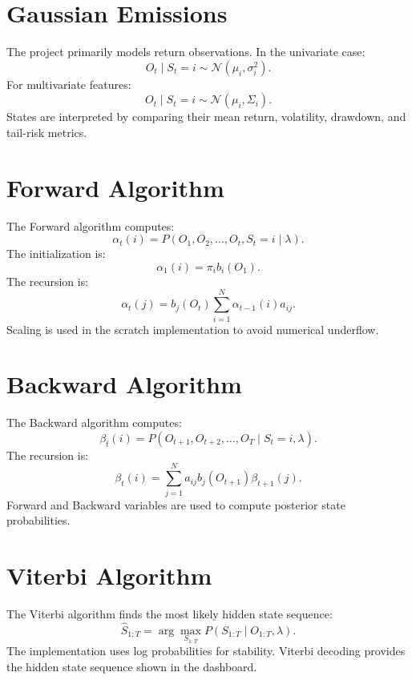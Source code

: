 \documentclass[12pt,a4paper]{report}
\begin{document}
\section{Gaussian Emissions}
The project primarily models return observations. In the univariate case:
\begin{equation}
    O_t \mid S_t=i \sim \mathcal{N}(\mu_i, \sigma_i^2).
\end{equation}
For multivariate features:
\begin{equation}
    O_t \mid S_t=i \sim \mathcal{N}(\mu_i, \Sigma_i).
\end{equation}
States are interpreted by comparing their mean return, volatility, drawdown, and tail-risk metrics.

\section{Forward Algorithm}
The Forward algorithm computes:
\begin{equation}
    \alpha_t(i) = P(O_1, O_2, \ldots, O_t, S_t=i \mid \lambda).
\end{equation}
The initialization is:
\begin{equation}
    \alpha_1(i) = \pi_i b_i(O_1).
\end{equation}
The recursion is:
\begin{equation}
    \alpha_t(j) = b_j(O_t)\sum_{i=1}^{N}\alpha_{t-1}(i)a_{ij}.
\end{equation}
Scaling is used in the scratch implementation to avoid numerical underflow.

\section{Backward Algorithm}
The Backward algorithm computes:
\begin{equation}
    \beta_t(i) = P(O_{t+1}, O_{t+2}, \ldots, O_T \mid S_t=i, \lambda).
\end{equation}
The recursion is:
\begin{equation}
    \beta_t(i) = \sum_{j=1}^{N} a_{ij}b_j(O_{t+1})\beta_{t+1}(j).
\end{equation}
Forward and Backward variables are used to compute posterior state probabilities.

\section{Viterbi Algorithm}
The Viterbi algorithm finds the most likely hidden state sequence:
\begin{equation}
    \hat{S}_{1:T} = \arg\max_{S_{1:T}} P(S_{1:T} \mid O_{1:T}, \lambda).
\end{equation}
The implementation uses log probabilities for stability. Viterbi decoding provides the hidden state sequence shown in the dashboard.
\end{document}
